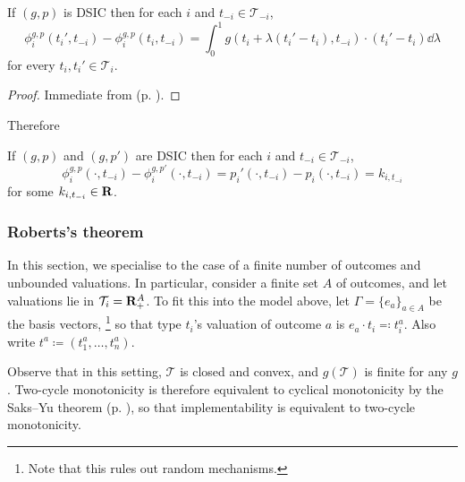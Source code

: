 \documentclass[11pt,letterpaper,reqno,oneside]{article}
\begin{document}
\begin{corollary}
	\label{corollary:IC_envelope_DSIC}
	If $(g,p)$ is DSIC then for each $i$ and $t_{-i} \in \mathcal{T}_{-i}$,
	\begin{equation*}
		\phi^{g,p}_i(t_i',t_{-i}) - \phi^{g,p}_i(t_i,t_{-i}) 
		= \int_0^1 g( t_i + \lambda(t_i'-t_i), t_{-i} ) \cdot (t_i'-t_i) \dd \lambda 
	\end{equation*}
	for every $t_i,t_i' \in \mathcal{T}_i$.
\end{corollary}

\begin{proof}
	Immediate from  (p. \pageref{theorem:IC_envelope}).
\end{proof}


Therefore
%
\begin{corollary}
	If $(g,p)$ and $(g,p')$ are DSIC then for each $i$ and $t_{-i} \in \mathcal{T}_{-i}$,
	\begin{equation*}
		\phi^{g,p}_i(\cdot,t_{-i}) - \phi^{g,p'}_i(\cdot,t_{-i}) 
		= p_i'(\cdot,t_{-i}) - p_i(\cdot,t_{-i}) 
		= k_{i,t_{-i}}
	\end{equation*}
	for some $k_{i,t_{-i}} \in \mathbf{R}$.
\end{corollary}



\subsubsection{Roberts's theorem}
\label{sec:mech_desi:single_agent_multiple_dimensions:Roberts_theorem}

In this section, we specialise to the case of a finite number of outcomes and unbounded valuations. In particular, consider a finite set $A$ of outcomes, and let valuations lie in $\mathcal{T}_i = \mathbf{R}_+^A$. To fit this into the model above, let $\Gamma = \{ e_a \}_{a \in A}$ be the basis vectors,%
	\footnote{Note that this rules out random mechanisms.}
so that type $t_i$'s valuation of outcome $a$ is $e_a \cdot t_i \eqqcolon t^a_i$. Also write $t^a \coloneqq (t^a_1,\dots,t^a_n)$.

Observe that in this setting, $\mathcal{T}$ is closed and convex, and $g(\mathcal{T})$ is finite for any $g$. Two-cycle monotonicity is therefore equivalent to cyclical monotonicity by the Saks--Yu theorem (p. \pageref{theorem:SaksYu}), so that implementability is equivalent to two-cycle monotonicity.
\end{document}
